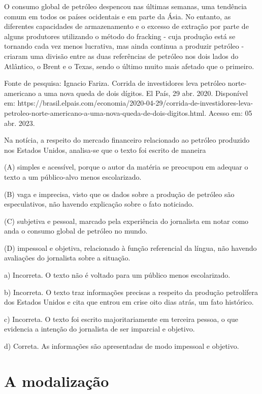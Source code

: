 \begin{itemize}
\begin{itemize}
O consumo global de petróleo despencou nas últimas semanas, uma
tendência comum em todos os países ocidentais e em parte da Ásia. No
entanto, as diferentes capacidades de armazenamento e o excesso de
extração por parte de alguns produtores utilizando o método do fracking
- cuja produção está se tornando cada vez menos lucrativa, mas ainda
continua a produzir petróleo - criaram uma divisão entre as duas
referências de petróleo nos dois lados do Atlântico, o Brent e o Texas,
sendo o último muito mais afetado que o primeiro.

Fonte de pesquisa: Ignacio Fariza. Corrida de investidores leva petróleo
norte-americano a uma nova queda de dois dígitos. El País, 29 abr. 2020.
Disponível em:
https://brasil.elpais.com/economia/2020-04-29/corrida-de-investidores-leva-petroleo-norte-americano-a-uma-nova-queda-de-dois-digitos.html.
Acesso em: 05 abr. 2023.

Na notícia, a respeito do mercado financeiro relacionado ao petróleo
produzido nos Estados Unidos, analisa-se que o texto foi escrito de
maneira

(A) simples e acessível, porque o autor da matéria se preocupou em
adequar o texto a um público-alvo menos escolarizado.

(B) vaga e imprecisa, visto que os dados sobre a produção de petróleo
são especulativos, não havendo explicação sobre o fato noticiado.

(C) subjetiva e pessoal, marcado pela experiência do jornalista em notar
como anda o consumo global de petróleo no mundo.

(D) impessoal e objetiva, relacionado à função referencial da língua,
não havendo avaliações do jornalista sobre a situação.


a) Incorreta. O texto não é voltado para um público menos escolarizado.

b) Incorreta. O texto traz informações precisas a respeito da produção
petrolífera dos Estados Unidos e cita que entrou em crise oito dias
atrás, um fato histórico.

c) Incorreta. O texto foi escrito majoritariamente em terceira pessoa, o
que evidencia a intenção do jornalista de ser imparcial e objetivo.

d) Correta. As informações são apresentadas de modo impessoal e
objetivo.

\chapter{A modalização}


\end{itemize}
\end{itemize}
